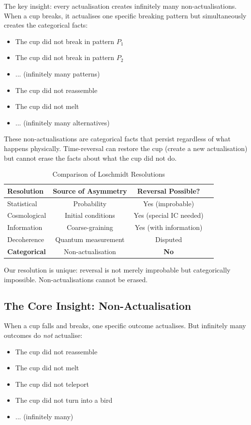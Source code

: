 \documentclass[twocolumn,10pt]{article}
\theoremstyle{definition}
\theoremstyle{remark}
\begin{document}
The key insight: every actualisation creates infinitely many non-actualisations. When a cup breaks, it actualises one specific breaking pattern but simultaneously creates the categorical facts:
\begin{itemize}
\item The cup did not break in pattern $P_1$
\item The cup did not break in pattern $P_2$
\item ... (infinitely many patterns)
\item The cup did not reassemble
\item The cup did not melt
\item ... (infinitely many alternatives)
\end{itemize}

These non-actualisations are categorical facts that persist regardless of what happens physically. Time-reversal can restore the cup (create a new actualisation) but cannot erase the facts about what the cup did not do.

\begin{table}[h]
\centering
\caption{Comparison of Loschmidt Resolutions}
\label{tab:resolutions}
\begin{tabular}{lccc}
\toprule
\textbf{Resolution} & \textbf{Source of Asymmetry} & \textbf{Reversal Possible?} \\
\midrule
Statistical & Probability & Yes (improbable) \\
Cosmological & Initial conditions & Yes (special IC needed) \\
Information & Coarse-graining & Yes (with information) \\
Decoherence & Quantum measurement & Disputed \\
\textbf{Categorical} & Non-actualisation & \textbf{No} \\
\bottomrule
\end{tabular}
\end{table}

Our resolution is unique: reversal is not merely improbable but categorically impossible. Non-actualisations cannot be erased.

\subsection{The Core Insight: Non-Actualisation}

When a cup falls and breaks, one specific outcome actualises. But infinitely many outcomes do \textit{not} actualise:
\begin{itemize}
\item The cup did not reassemble
\item The cup did not melt
\item The cup did not teleport
\item The cup did not turn into a bird
\item ... (infinitely many)
\end{itemize}
\end{document}
